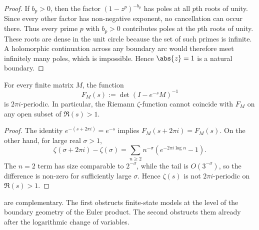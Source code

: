 \begin{proof}
  If $b_p>0$, then the factor $(1-z^p)^{-b_p}$ has poles at all $p$th
  roots of unity. Since every other factor has non-negative exponent,
  no cancellation can occur there. Thus every prime $p$ with $b_p>0$
  contributes poles at the $p$th roots of unity. These roots are dense
  in the unit circle because the set of such primes is infinite. A
  holomorphic continuation across any boundary arc would therefore meet
  infinitely many poles, which is impossible. Hence $\abs{z}=1$ is a
  natural boundary.
\end{proof}

\begin{proposition}
  \label{prop:finite-zeta-imaginary-periodicity}
  For every finite matrix $M$, the function
  \[
    F_M(s):=\det(I-e^{-s}M)^{-1}
  \]
  is $2\pi i$-periodic. In particular, the Riemann
  $\zeta$-function cannot coincide with $F_M$ on any open subset of
  $\Re(s)>1$.
\end{proposition}

\begin{proof}
  The identity $e^{-(s+2\pi i)}=e^{-s}$ implies
  $F_M(s+2\pi i)=F_M(s)$. On the other hand, for large real $\sigma>1$,
  \[
    \zeta(\sigma+2\pi i)-\zeta(\sigma)
    =\sum_{n\ge 2}n^{-\sigma}(e^{-2\pi i\log n}-1).
  \]
  The $n=2$ term has size comparable to $2^{-\sigma}$, while the tail
  is $O(3^{-\sigma})$, so the difference is non-zero for sufficiently
  large $\sigma$. Hence $\zeta(s)$ is not $2\pi i$-periodic on
  $\Re(s)>1$.
\end{proof}

\begin{remark}
  are complementary. The first obstructs finite-state models at the
  level of the boundary geometry of the Euler product. The second
  obstructs them already after the logarithmic change of variables.
\end{remark}
